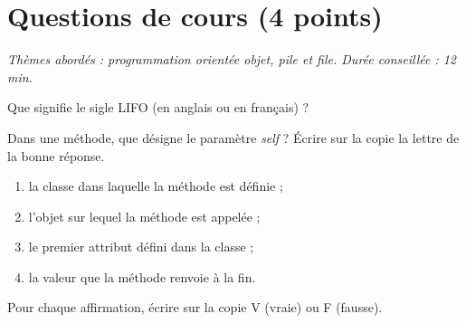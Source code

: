 \documentclass[a4paper, noanswers, addpoints, 12pt]{exam}
\begin{document}
\section{Questions de cours (4 points)}
\begin{center}\textit{Thèmes abordés : programmation orientée objet, pile et file. Durée conseillée : 12 min.}\end{center}

\begin{questions}
\question[\half] Que signifie le sigle LIFO (en anglais ou en français) ?

\question[\half] Dans une méthode, que désigne le paramètre \textit{self} ? Écrire sur la copie la lettre de la bonne réponse.
\begin{enumerate}[label=\alph*), itemsep=0pt, topsep=2pt]
\item la classe dans laquelle la méthode est définie ;
\item l'objet sur lequel la méthode est appelée ;
\item le premier attribut défini dans la classe ;
\item la valeur que la méthode renvoie à la fin.
\end{enumerate}

\question Pour chaque affirmation, écrire sur la copie V (vraie) ou F (fausse).


\end{questions}
\end{document}
